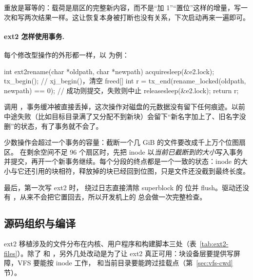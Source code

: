 重放是幂等的：载荷是扇区的完整新内容，而不是“加 1”“置位”这样的增量，写一次和写两次结果一样。这让恢复本身被打断也没有关系，下次启动再来一遍即可。

\paragraph{ext2 怎样使用事务.} 每个修改型操作的外形都一样，以  为例：

\begin{ccode}
int ext2rename(char *oldpath, char *newpath) {
  acquiresleep(&e2.lock);
  tx_begin();                                               // xj_begin()，清空 freed[]
  int r = tx_end(rename_locked(oldpath, newpath) == 0);     // 成功则提交，失败则中止
  releasesleep(&e2.lock);
  return r;
}
\end{ccode}

 调用 ，事务缓冲被直接丢掉，这次操作对磁盘的元数据没有留下任何痕迹。以前  中途失败（比如目标目录满了又分配不到新块）会留下“新名字加上了、旧名字没删”的状态，有了事务就不会了。

少数操作会超过一个事务的容量：截断一个几 GiB 的文件要改成千上万个位图扇区。 在剩余空间不足 96 个扇区时，先把 inode 以\emph{当前已截断到的大小}写入事务并提交，再开一个新事务继续。每个分段的终点都是一个一致的状态：inode 的大小与它还引用的块相符，释放掉的块已经回到位图，只是文件还没截到最终长度。

最后，第一次写 ext2 时， 绕过日志直接清除 superblock 的  位并 flush。驱动还没有 ，从来不会把它置回去，所以开发机上的  总会做一次完整检查。

\subsection{源码组织与编译}
\label{sec:ext2-build}

ext2 移植涉及的文件分布在内核、用户程序和构建脚本三处（表~\ref{tab:ext2-files}）。除了  和 ，另外几处改动是为了让 ext2 真正可用：块设备层要提供写屏障，VFS 要能按 inode 工作， 和当前目录要能跨过挂载点（第~\ref{sec:vfs-cwd} 节）。

